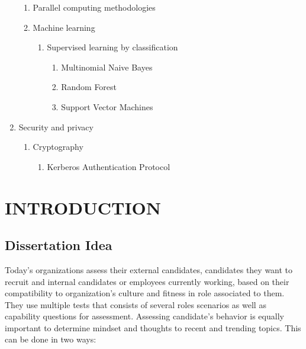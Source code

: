 \documentclass[oneside,a4paper,12pt]{pictreport}
\begin{document}
\begin{enumerate}[label=\Alph*]
\begin{enumerate}[label*=.\arabic*]
            \item Parallel computing methodologies
            \item Machine learning
            \begin{enumerate}[label*=.\arabic*]
                \item Supervised learning by classification
                \begin{enumerate}[label*=.\arabic*]
                    \item Multinomial Naive Bayes
                    \item Random Forest
                    \item Support Vector Machines
                \end{enumerate}
            \end{enumerate}
        \end{enumerate}
    \item Security and privacy
    \begin{enumerate}[label*=.\arabic*]
        \item Cryptography
        \begin{enumerate}[label*=.\arabic*]
            \item Kerberos Authentication Protocol
        \end{enumerate}
    \end{enumerate}
\end{enumerate}
\chapter{INTRODUCTION}

\section{Dissertation Idea}

\hspace{1.1cm} Today's organizations assess their external candidates, candidates they want to recruit and internal candidates or employees currently working, based on their compatibility to organization's culture and fitness in role associated to them. They use multiple tests that consists of several roles scenarios as well as capability questions for assessment. Assessing candidate’s behavior is equally important to determine mindset and thoughts to recent and trending topics. This can be done in two ways:
\end{document}
